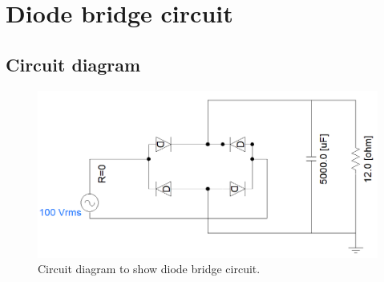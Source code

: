 \section{Diode bridge circuit}
\subsection{Circuit diagram}
\begin{figure}[H]
    \centering
    \includegraphics[width = \textwidth]{img/figure1.png}
    \caption{Circuit diagram to show diode bridge circuit.}
\end{figure}
